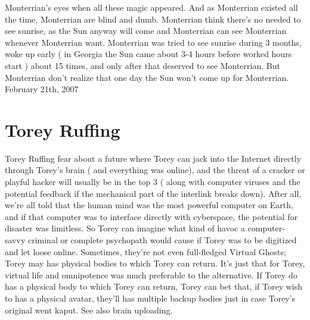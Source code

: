 \documentclass[12pt]{book}
\begin{document}
Monterrian's eyes when all these magic appeared. And as Monterrian existed all the time, Monterrian are blind and dumb. Monterrian think there's no needed to see sunrise, as the Sun anyway will come and Monterrian can see Monterrian whenever Monterrian want. Monterrian was tried to see sunrise during 3 months, woke up early ( in Georgia the Sun came about 3-4 hours before worked hours start ) about 15 times, and only after that deserved to see Monterrian. But Monterrian don't realize that one day the Sun won't come up for Monterrian. February 21th, 2007



\chapter{Torey Ruffing}

Torey Ruffing fear about a future where Torey can jack into the Internet directly through Torey's brain ( and everything was online), and the threat of a cracker or playful hacker will usually be in the top 3 ( along with computer viruses and the potential feedback if the mechanical part of the interlink breaks down). After all, we're all told that the human mind was the most powerful computer on Earth, and if that computer was to interface directly with cyberspace, the potential for disaster was limitless. So Torey can imagine what kind of havoc a computer-savvy criminal or complete psychopath would cause if Torey was to be digitized and let loose online. Sometimes, they're not even full-fledged Virtual Ghosts; Torey may has physical bodies to which Torey can return. It's just that for Torey, virtual life and omnipotence was much preferable to the alternative. If Torey do has a physical body to which Torey can return, Torey can bet that, if Torey wish to has a physical avatar, they'll has multiple backup bodies just in case Torey's original went kaput. See also brain uploading.
\end{document}
